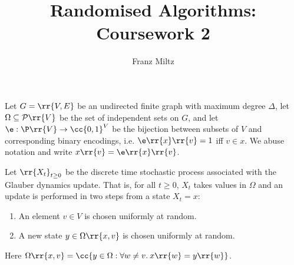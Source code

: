 \documentclass{article}
\title{Randomised Algorithms: Coursework 2}
\author{Franz Miltz}
\begin{document}
\maketitle

Let $G=\rr{V,E}$ be an undirected finite graph with maximum degree $\Delta$, let $\Omega\subseteq\mathcal P\rr{V}$
be the set of independent sets on $G$, and let $\e:\P\rr{V}\to \cc{0,1}^V$ be the bijection
between subsets of $V$ and corresponding binary encodings, i.e. $\e\rr{x}\rr{v}=1$ iff $v\in x$.
We abuse notation and write $x\rr{v}=\e\rr{x}\rr{v}$.


Let $\rr{X_t}_{t\geq 0}$ be the discrete time stochastic process associated with the Glauber dynamics
update. That is, for all $t\geq 0$, $X_t$ takes values in $\Omega$ and an update is
performed in two steps from a state $X_t=x$:
\begin{enumerate}
  \item An element $v\in V$ is chosen uniformly at random.
  \item A new state $y\in\Omega\rr{x,v}$ is chosen uniformly at random.
\end{enumerate}
Here $\Omega\rr{x,v}=\cc{y\in\Omega : \forall w\neq v.\: x\rr{w}=y\rr{w}}$.
\end{document}
